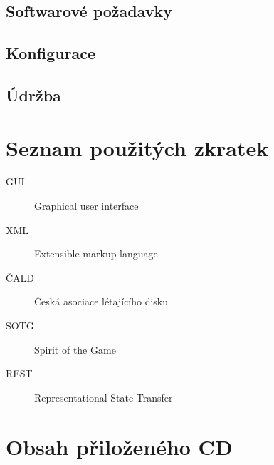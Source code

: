 \documentclass[thesis=B,czech]{FITthesis}[2012/06/26]
\begin{document}
\section{Softwarové požadavky}

\section{Konfigurace}

\section{Údržba}


\begin{conclusion}
\end{conclusion}

%
%
%



\appendix

\chapter{Seznam použitých zkratek}
\begin{description}
	\item[GUI] Graphical user interface
	\item[XML] Extensible markup language
	\item[ČALD] Česká asociace létajícího disku
	\item[SOTG] Spirit of the Game
	\item[REST] Representational State Transfer
\end{description}

\chapter{Obsah přiloženého CD}


\begin{figure}
\end{figure}
\end{document}

